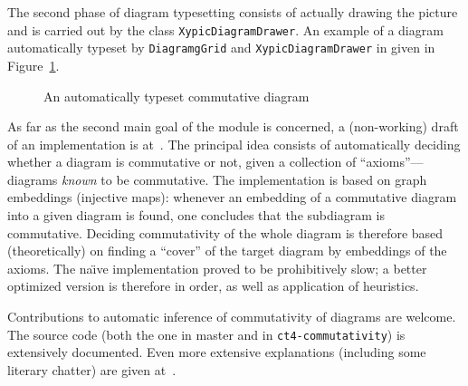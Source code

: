 The second phase of diagram typesetting consists of actually drawing the picture
and is carried out by the class \texttt{XypicDiagramDrawer}.  An example of a
diagram automatically typeset by \texttt{DiagramgGrid} and
\texttt{XypicDiagramDrawer} in given in Figure~\ref{fig:cat:loops}.
\begin{figure}[h]
  \centerline{
  }
  \caption{An automatically typeset commutative diagram}\label{fig:cat:loops}
\end{figure}

As far as the second main goal of the module is concerned, a (non-working) draft
of an implementation is at~\cite{ct4commutativity}.  The principal idea consists
of automatically deciding whether a diagram is commutative or not, given a
collection of ``axioms''---diagrams \textit{known} to be commutative.  The
implementation is based on graph embeddings (injective maps): whenever an
embedding of a commutative diagram into a given diagram is found, one concludes
that the subdiagram is commutative.  Deciding commutativity of the whole diagram
is therefore based (theoretically) on finding a ``cover'' of the target diagram
by embeddings of the axioms.  The na\"{\i}ve implementation proved to be
prohibitively slow; a better optimized version is therefore in order, as well as
application of heuristics.

Contributions to automatic inference of commutativity of diagrams are welcome.
The source code (both the one in master and in \texttt{ct4-commutativity}) is
extensively documented.  Even more extensive explanations (including some
literary chatter) are given at~\cite{scolobb}.
